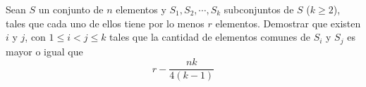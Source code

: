 Sean $S$ un conjunto de $n$ elementos y $S_1, S_2, \cdots , S_k$ subconjuntos de $S$ ($k \geq 2$), tales que cada uno de ellos tiene por lo menos $r$ elementos. \newline 
Demostrar que existen $i$ y $j$, con $1 \leq i < j \leq k$ tales que la cantidad de elementos comunes de $S_i$ y $S_j$ es mayor o igual que
\[ r - \frac{nk}{4(k-1)} \]
